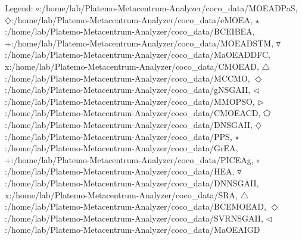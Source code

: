 Legend: {\color{CornflowerBlue}$\circ$}:/home/lab/Platemo-Metacentrum-Analyzer/coco\_data/MOEADPaS, {{}$\diamondsuit$}:/home/lab/Platemo-Metacentrum-Analyzer/coco\_data/eMOEA, {\color{Green}$\star$}:/home/lab/Platemo-Metacentrum-Analyzer/coco\_data/BCEIBEA, {\color{red}+}:/home/lab/Platemo-Metacentrum-Analyzer/coco\_data/MOEADSTM, {\color{brown}$\triangledown$}:/home/lab/Platemo-Metacentrum-Analyzer/coco\_data/MaOEADDFC, {{}x}:/home/lab/Platemo-Metacentrum-Analyzer/coco\_data/CMOEAD, {{}$\triangle$}:/home/lab/Platemo-Metacentrum-Analyzer/coco\_data/MCCMO, {{}$\Diamond$}:/home/lab/Platemo-Metacentrum-Analyzer/coco\_data/gNSGAII, {{}$\triangleleft$}:/home/lab/Platemo-Metacentrum-Analyzer/coco\_data/MMOPSO, {{}$\triangleright$}:/home/lab/Platemo-Metacentrum-Analyzer/coco\_data/CMOEACD, {{}$\pentagon$}:/home/lab/Platemo-Metacentrum-Analyzer/coco\_data/DNSGAII, {{}$\diamondsuit$}:/home/lab/Platemo-Metacentrum-Analyzer/coco\_data/PPS, {{}$\star$}:/home/lab/Platemo-Metacentrum-Analyzer/coco\_data/GrEA, {{}+}:/home/lab/Platemo-Metacentrum-Analyzer/coco\_data/PICEAg, {{}$\circ$}:/home/lab/Platemo-Metacentrum-Analyzer/coco\_data/HEA, {{}$\triangledown$}:/home/lab/Platemo-Metacentrum-Analyzer/coco\_data/DNNSGAII, {{}x}:/home/lab/Platemo-Metacentrum-Analyzer/coco\_data/SRA, {{}$\triangle$}:/home/lab/Platemo-Metacentrum-Analyzer/coco\_data/BCEMOEAD, {{}$\Diamond$}:/home/lab/Platemo-Metacentrum-Analyzer/coco\_data/SVRNSGAII, {{}$\triangleleft$}:/home/lab/Platemo-Metacentrum-Analyzer/coco\_data/MaOEAIGD